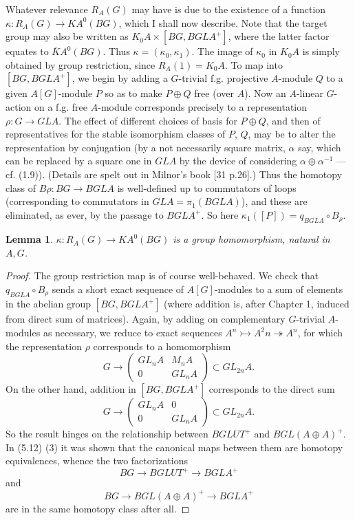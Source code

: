 \documentclass[openany,leqno]{book}  %
\newtheorem{lemma}[theorem]{Lemma}
\begin{document}
Whatever relevance $R_A(G)$ may have is due to the existence of a function $\kappa  \colon   R_A(G)\longrightarrow KA^0(BG)$, which I shall now describe. Note that the target group may also be written as $K_0A \times [BG, BGLA^+]$, where the latter factor equates to $\bar{K}A^0(BG)$. Thus $\kappa  = (\kappa_0, \kappa_1 )$. The image of $\kappa_0$ in $K_0A$ is simply obtained by group restriction, since $R_A(1) = K_0A$. To map into $[BG, BGLA^+]$, we begin by adding a $G$-trivial f.g. projective $A$-module $Q$ to a given $A[G]$-module $P$ so as to make $P \oplus Q$ free (over $A$). Now an $A$-linear $G$-action on a f.g. free $A$-module corresponds precisely to a representation $\rho \colon   G\longrightarrow GLA$. The effect of different choices of basis for $P \oplus Q$, and then of representatives for the stable isomorphism classes of $P$, $Q$, may be to alter the representation by conjugation (by a not necessarily square matrix, $\alpha$ say, which can be replaced by a square one in $GLA$ by the device of considering $\alpha \oplus \alpha
^{-1}$ --- cf. (1.9)). (Details are spelt out in Milnor's book [31 p.26].) Thus the homotopy class of $B\rho \colon   BG\longrightarrow BGLA$ is well-defined up to commutators of loops (corresponding to commutators in $GLA = \pi_1(BGLA)$), and these are eliminated, as ever, by the passage to $BGLA^+$. So here $\kappa_1([P]) = q_{BGLA}\circ B_\rho$.
\begin{lemma}
  $\kappa \colon   R_A(G) \longrightarrow KA^0(BG)$ is a group homomorphism, natural in $A, G$.
\end{lemma}
\begin{proof}
The group restriction map is of course well-behaved. We check that $q_{BGLA}\circ B_\rho$ sends a short exact sequence of $A[G]$-modules to a sum of elements in the abelian group $[BG, BGLA^+]$ (where addition is, after Chapter 1, induced from direct sum of matrices). Again, by adding on complementary $G$-trivial $A$-modules as necessary, we reduce to exact sequences $A^n \rightarrowtail A^2n\twoheadrightarrow A^n$, for which the representation $\rho$ corresponds to a homomorphism
\[G\longrightarrow \begin{pmatrix}
  GL_nA & M_nA \\0& GL_nA
\end{pmatrix} \subset GL_{2n}A.\]
On the other hand, addition in $[BG, BGLA^+]$ corresponds to the direct sum
\[G\longrightarrow \begin{pmatrix}
  GL_nA & 0 \\0& GL_nA
\end{pmatrix} \subset GL_{2n}A.\]
So the result hinges on the relationship between $BGLUT^+$ and $BGL(A\oplus A)^+$. In (5.12) (3) it was shown that the canonical maps between them are homotopy equivalences, whence the two
factorizations
\[BG\longrightarrow BGLUT^+ \longrightarrow BGLA^+\]
and 
\[BG \longrightarrow  BGL(A\oplus A)^+ \longrightarrow BGLA^+\]
are in the same homotopy class after all.
\end{proof}
\end{document}
